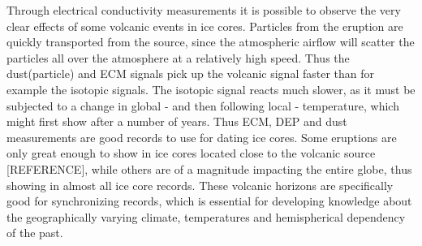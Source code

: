 \documentclass[../../CompleteThesis2/Complete_2ndDraft]{subfiles}
\begin{document}
Through electrical conductivity measurements it is possible to observe the very clear effects of some volcanic events in ice cores. Particles from the eruption are quickly transported from the source, since the atmospheric airflow will scatter the particles all over the atmosphere at a relatively high speed. Thus the dust(particle) and ECM signals pick up the volcanic signal faster than for example the isotopic signals. The isotopic signal reacts much slower, as it must be subjected to a change in global - and then following local - temperature, which might first show after a number of years. Thus ECM, DEP and dust measurements are good records to use for dating ice cores. Some eruptions are only great enough to show in ice cores located close to the volcanic source [REFERENCE], while others are of a magnitude impacting the entire globe, thus showing in almost all ice core records. These volcanic horizons are specifically good for synchronizing records, which is essential for developing knowledge about the geographically varying climate, temperatures and hemispherical dependency of the past. 
\end{document}
